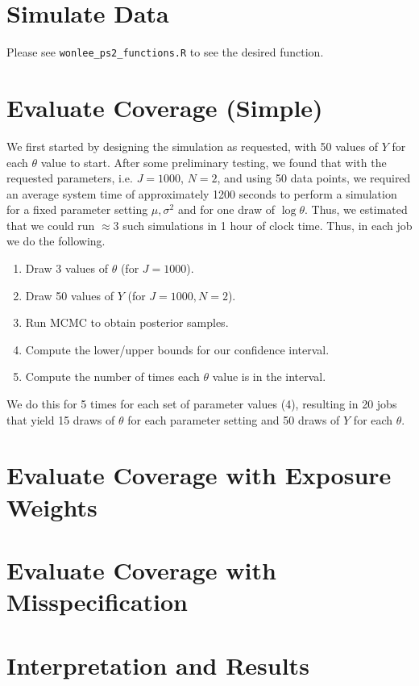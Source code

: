 \documentclass[psamsfonts]{amsart}
\theoremstyle{definition}
\theoremstyle{remark}
\numberwithin{equation}{section}
\begin{document}
\section{Simulate Data}

Please see \texttt{wonlee\_ps2\_functions.R} to see the desired function.

\section{Evaluate Coverage (Simple)}

We first started by designing the simulation as requested, with 50 values of $Y$ for each $\theta$ value to start. After some preliminary testing, we found that with the requested parameters, i.e. $J=1000$, $N=2$, and using 50 data points, we required an average system time of approximately 1200 seconds to perform a simulation for a fixed parameter setting $\mu, \sigma^2$ and for one draw of $\log \theta$. Thus, we estimated that we could run $\approx 3$ such simulations in 1 hour of clock time. Thus, in each job we do the following.
\begin{enumerate}
\item Draw 3 values of $\theta$ (for $J = 1000$).
\item Draw 50 values of $Y$ (for $J = 1000, N = 2$).
\item Run MCMC to obtain posterior samples.
\item Compute the lower/upper bounds for our confidence interval.
\item Compute the number of times each $\theta$ value is in the interval.
\end{enumerate}
We do this for 5 times for each set of parameter values (4), resulting in 20 jobs that yield 15 draws of $\theta$ for each parameter setting and 50 draws of $Y$ for each $\theta$.

\section{Evaluate Coverage with Exposure Weights}

\section{Evaluate Coverage with Misspecification}

\section{Interpretation and Results}
\end{document}
